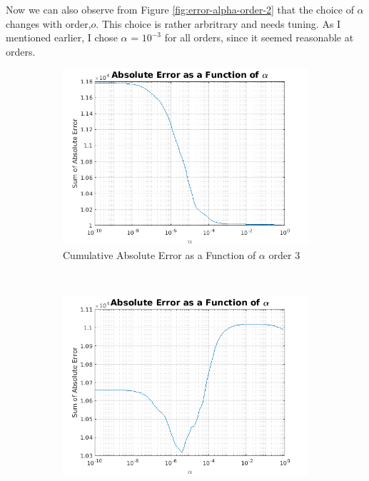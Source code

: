 \documentclass[11pt, fleqn]{article}
\begin{document}
Now we can also observe from Figure \ref{fig:error-alpha-order-2} that the choice of $\alpha$ changes with order,$o$. This choice is rather arbritrary and needs tuning. As I mentioned earlier, I chose $\alpha$ = $10^{-3}$ for all orders, since it seemed reasonable at orders.

\begin{figure}[!h]
    \centering
    \begin{subfigure}[b]{0.3\textwidth}
        \includegraphics[width=\textwidth]{error-vs-alpha-order-3.png}
	\caption{Cumulative Absolute Error as a Function of $\alpha$ order 3}
	\label{fig:error-vs-alpha-order-3}
    \end{subfigure}
    ~ 
	\begin{subfigure}[b]{0.3\textwidth}
        \includegraphics[width=\textwidth]{error_alpha_order_2.png}

\end{subfigure}
\end{figure}
\end{document}
